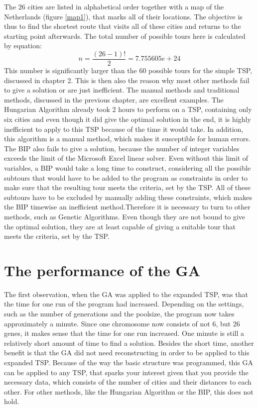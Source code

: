\newpage
\par
The 26 cities are listed in alphabetical order together with a map of the Netherlands (figure \ref{map1}), that marks all of their locations. The objective is thus to find the shortest route that visits all of these cities and returns to the starting point afterwards. The total number of possible tours here is calculated by equation: %
\[n = \frac{(26-1)!}{2} =  7.755605e+24\]
This number is significantly larger than the 60 possible tours for the simple TSP, discussed in chapter 2. This is then also the reason why most other methods fail to give a solution or are just inefficient. The manual methods and traditional methods, discussed in the previous chapter, are excellent examples. The Hungarian Algorithm already took 2 hours to perform on a TSP, containing only six cities and even though it did give the optimal solution in the end, it is highly inefficient to apply to this TSP because of the time it would take. In addition, this algorithm is a manual method, which makes it susceptible for human errors. The BIP also fails to give a solution, because the number of integer variables exceeds the limit of the Microsoft Excel linear solver. Even without this limit of variables, a BIP would take a long time to construct, considering all the possible subtours that would have to be added to the program as constraints in order to make sure that the resulting tour meets the criteria, set by the TSP. All of these subtours have to be excluded by manually adding these constraints, which makes the BIP timewise an inefficient method.Therefore it is necessary to turn to other methods, such as Genetic Algorithms. Even though they are not bound to give the optimal solution, they are at least capable of giving a suitable tour that meets the criteria, set by the TSP.

\section{The performance of the GA}

\par
The first observation, when the GA was applied to the expanded TSP, was that the time for one run of the program had increased. Depending on the settings, such as the number of generations and the poolsize, the program now takes approximately a minute. Since one chromosome now consists of not 6, but 26 genes, it makes sense that the time for one run increased. One minute is still a relatively short amount of time to find a solution. Besides the short time, another benefit is that the GA did not need reconstructing in order to be applied to this expanded TSP. Because of the way the basic structure was programmed, this GA can be applied to any TSP, that sparks your interest given that you provide the necessary data, which consists of the number of cities and their distances to each other. For other methods, like the Hungarian Algorithm or the BIP, this does not hold. 
